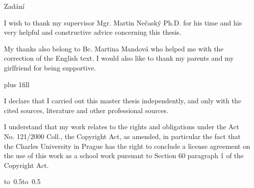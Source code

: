 \documentclass[12pt,a4paper]{report}
\let\openright=\clearpage
\begin{document}
\newpage

Zadání

\newpage



\openright

\noindent
I wish to thank my supervisor Mgr. Martin Nečaský Ph.D. for his time and his
very helpful and constructive advice concerning this thesis.

My thanks also belong to Bc. Martina Mandová who helped me
with the correction of the English text. I would also like to thank
my parents and my girlfriend for being supportive.

\newpage


\vglue 0pt plus 1fill

\noindent
I declare that I carried out this master thesis independently, and only with the cited
sources, literature and other professional sources.

\medskip\noindent
I understand that my work relates to the rights and obligations under the Act No.
121/2000 Coll., the Copyright Act, as amended, in particular the fact that the Charles
University in Prague has the right to conclude a license agreement on the use of this
work as a school work pursuant to Section 60 paragraph 1 of the Copyright Act.

\vspace{10mm}

\hbox{\hbox to 0.5\hbox to 0.5}

\vspace{20mm}
\newpage

\end{document}
